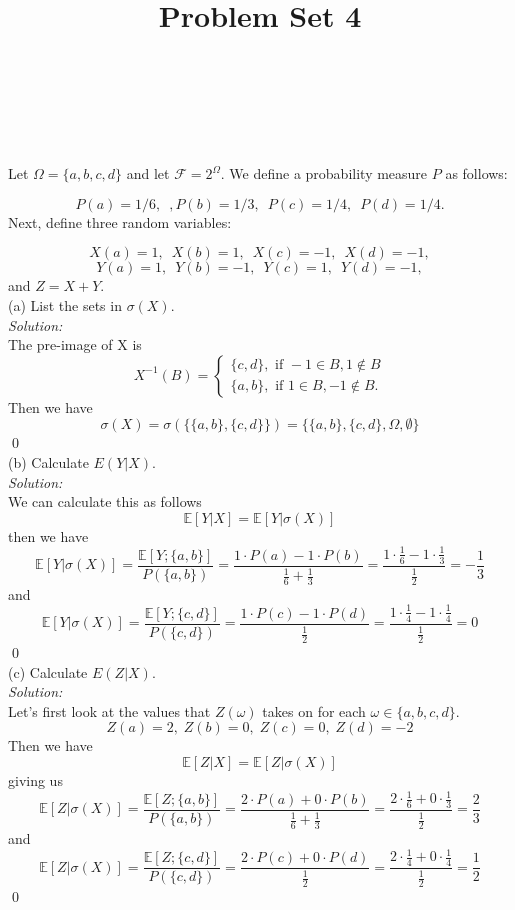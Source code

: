 \documentclass[10pt]{amsart}
\begin{document}
\noindent
{} \\
 \\
 \\
\title{Problem Set 4}
\maketitle

 Let $\Omega=\{a,b,c,d\}$ and let $\mathcal{F}=2^{\Omega}$. We define a probability measure $P$ as follows:

$$P({a})=1/6, \,\,\,, P({b})=1/3, \,\,\, P({c})=1/4, \,\,\, P({d})=1/4.$$
Next, define three random variables:

$$X(a)=1, \,\,\, X(b)=1, \,\,\, X(c)=-1, \,\,\,  X(d)=-1,$$
$$Y(a)=1, \,\,\, Y(b)=-1, \,\,\, Y(c)=1, \,\,\,  Y(d)=-1,$$
and $Z=X+Y$. \\

\noindent
(a) List the sets in $\sigma(X)$. \\
\textit{Solution:} \\
The pre-image of X is
$$
X^{-1}(B) =
\begin{cases}
	\{c, d\}, \text{ if } -1 \in B, 1 \not\in B \\
	\{a, b\}, \text{ if } 1 \in B, -1 \not\in B.
\end{cases}
$$
Then we have
$$\sigma(X) = \sigma(\big\{ \{a, b\}, \{c, d\} \big\}) = \bigg\{ \{a, b\}, \{c, d\}, \Omega, \emptyset \bigg\}$$
\qed
\\

\noindent
(b) Calculate $E(Y|X)$. \\
\textit{Solution:} \\
We can calculate this as follows
$$
\mathbb E[Y | X] = \mathbb E [Y | \sigma(X)]
$$
then we have
$$
\mathbb E [Y | \sigma(X)] = \frac {\mathbb E[ Y; \{ a, b \}]}{P(\{ a, b\})} = \frac {1\cdot P(a)  -1\cdot P(b)}{\frac 1 6 + \frac 1 3} = \frac {1\cdot \frac 1 6 - 1\cdot \frac 1 3}{\frac 1 2} = - \frac 1 3
$$
and
$$
\mathbb E [Y | \sigma(X)] = \frac {\mathbb E[ Y; \{ c, d \}]}{P(\{ c, d\})} = \frac {1\cdot P(c) - 1\cdot P(d)}{\frac 1 2} = \frac { 1\cdot \frac 1 4 - 1\cdot \frac 1 4}{\frac 1 2}  = 0
$$
\qed \\

\noindent
(c) Calculate $E(Z|X)$. \\
\textit{Solution:} \\
Let's first look at the values that $Z(\omega)$ takes on for each $\omega \in \{a, b, c, d\}$.
$$
Z(a) = 2,\;Z(b) = 0,\;Z(c) = 0,\;Z(d) = -2
$$
Then we have
$$
\mathbb E[Z|X] = \mathbb E[Z | \sigma(X)]
$$
giving us
$$
\mathbb E [Z | \sigma(X)] = \frac {\mathbb E[ Z; \{ a, b \}]}{P(\{ a, b\})} = \frac {2\cdot P(a) + 0\cdot P(b)}{\frac 1 6 + \frac 1 3} = \frac {2\cdot \frac 1 6 + 0\cdot \frac 1 3}{\frac 1 2} = \frac 2 3
$$
and
$$
\mathbb E [Z | \sigma(X)] = \frac {\mathbb E[ Z; \{ c, d \}]}{P(\{ c, d\})} = \frac {2\cdot P(c) + 0\cdot P(d)}{\frac 1 2} = \frac {2\cdot \frac 1 4 + 0\cdot \frac 1 4}{\frac 1 2}  = \frac 1 2
$$
\qed \\
\newpage
\end{document}
